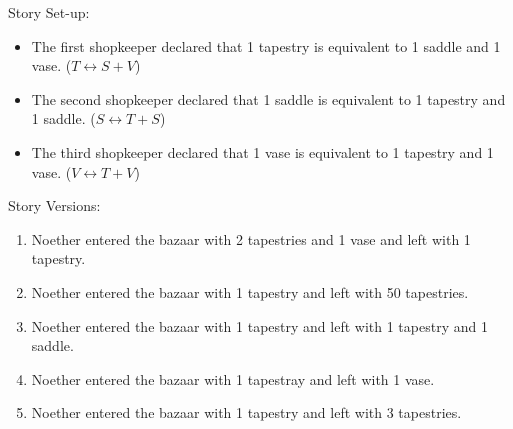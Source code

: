 Story Set-up:
\begin{itemize}
\item The first shopkeeper declared that 1 tapestry is equivalent to 1 saddle and 1 vase. (\(T \leftrightarrow S + V\))
\item The second shopkeeper declared that 1 saddle is equivalent to 1 tapestry and 1 saddle. (\(S \leftrightarrow T + S\))
\item The third shopkeeper declared that 1 vase is equivalent to 1 tapestry and 1 vase. (\(V \leftrightarrow T + V\))
\end{itemize}

Story Versions:
\begin{enumerate}
\item Noether entered the bazaar with 2 tapestries and 1 vase and left with 1 tapestry.
\item Noether entered the bazaar with 1 tapestry and left with 50 tapestries.
\item Noether entered the bazaar with 1 tapestry and left with 1 tapestry and 1 saddle.
\item Noether entered the bazaar with 1 tapestray and left with 1 vase.
\item Noether entered the bazaar with 1 tapestry and left with 3 tapestries.
\end{enumerate}

